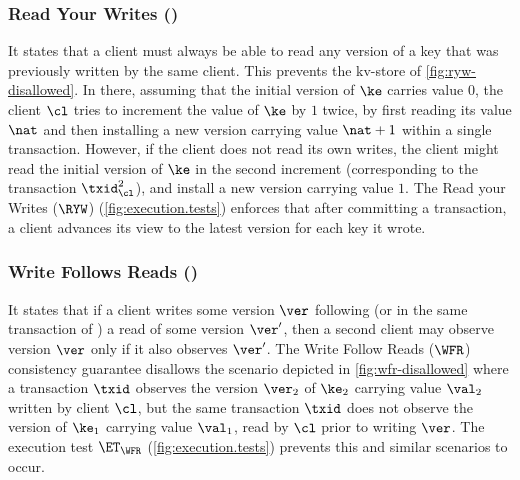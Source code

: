 \subsubsection{Read Your Writes (\RYW)}
It states that a client must always be able to read any version 
of a key that was previously written by the same client. This prevents the kv-store of \cref{fig:ryw-disallowed}. 
In there, assuming that the initial version of $\ke$ carries value $0$, the client $\cl$ tries to increment the value of $\ke$ by $1$ twice, 
by first reading its value $\nat$ and then installing a new version carrying  value $\nat+1$ within a single transaction.
However, if the client does not read its 
own writes, the client might read the initial version of $\ke$ in the second increment 
(corresponding to the transaction $\txid_{\cl}^2$), and install a new version carrying value $1$.
The Read your Writes ($\RYW$) (\cref{fig:execution.tests}) enforces that after committing a transaction, 
a client advances its view to the latest version for each key it wrote.  

\subsubsection{Write Follows Reads (\WFR)}
It states that if a client writes some version $\ver$ following (or in the same transaction of ) 
a read of some version $\ver'$, 
then a second client may observe version $\ver$ only if it also observes $\ver'$. The Write Follow Reads ($\WFR$) 
consistency guarantee disallows the scenario depicted in  \cref{fig:wfr-disallowed} 
where a transaction $\txid$ observes the version $\ver_2$ of $\ke_2$ carrying value $\val_2$ written by client $\cl$,
but the same transaction $\txid$ does not observe 
the version of $\ke_1$ carrying value $\val_1$, read by $\cl$ prior to writing $\ver$. 
The execution test $\ET_{\WFR}$ (\cref{fig:execution.tests}) prevents this and similar scenarios to occur.

